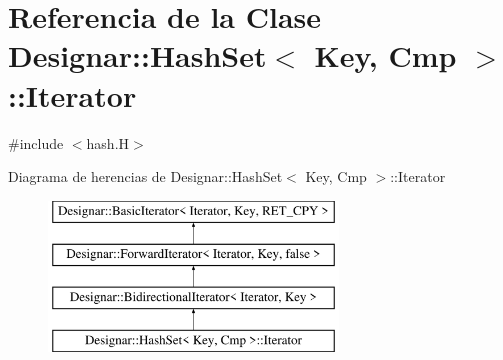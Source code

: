 \hypertarget{class_designar_1_1_hash_set_1_1_iterator}{}\section{Referencia de la Clase Designar\+:\+:Hash\+Set$<$ Key, Cmp $>$\+:\+:Iterator}
\label{class_designar_1_1_hash_set_1_1_iterator}


{\ttfamily \#include $<$hash.\+H$>$}

Diagrama de herencias de Designar\+:\+:Hash\+Set$<$ Key, Cmp $>$\+:\+:Iterator\begin{figure}[H]
\begin{center}
\leavevmode
\includegraphics[height=4.000000cm]{class_designar_1_1_hash_set_1_1_iterator}
\end{center}
\end{figure}
